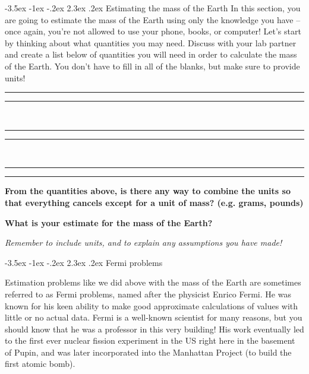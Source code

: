 \documentclass[12pt]{article}
\makeatletter
\renewcommand\section{\@startsection{section}{1}{\z@}%
                                  {-3.5ex \@plus -1ex \@minus -.2ex}%
                                  {2.3ex \@plus.2ex}%
                                  {\normalfont\large\bfseries}}
\makeatother
\begin{document}
\section{Estimating the mass of the Earth}
\indent\indent In this section, you are going to estimate the mass of the Earth using only the knowledge you have -- once again, you're not allowed to use your phone, books, or computer! Let's start by thinking about what quantities you may need. Discuss with your lab partner and create a list below of quantities you will need in order to calculate the mass of the Earth. You don't have to fill in all of the blanks, but make sure to provide units! \\
\begin{center}
	 \rule{5cm}{0.75pt} \hspace{0.2in} \rule{5cm}{0.75pt} \\
	 \vspace{0.2in}
	 \rule{5cm}{0.75pt} \hspace{0.2in} \rule{5cm}{0.75pt} \\
	 \vspace{0.2in}
	 \rule{5cm}{0.75pt} \hspace{0.2in} \rule{5cm}{0.75pt}
\end{center}

\noindent\textbf{From the quantities above, is there any way to combine the units so that everything cancels except for a unit of mass? (e.g. grams, pounds)}
\vspace{1.0in}

\noindent\textbf{What is your estimate for the mass of the Earth?}

\emph{Remember to include units, and to explain any assumptions you have made!}
\vspace{2.0in}

\clearpage

\section{Fermi problems}

\indent\indent Estimation problems like we did above with the mass of the Earth are sometimes referred to as Fermi problems, named after the physicist Enrico Fermi. He was known for his keen ability to make good approximate calculations of values with little or no actual data. Fermi is a well-known scientist for many reasons, but you should know that he was a professor in this very building! His work eventually led to the first ever nuclear fission experiment in the US right here in the basement of Pupin, and was later incorporated into the Manhattan Project (to build the first atomic bomb).
\end{document}
